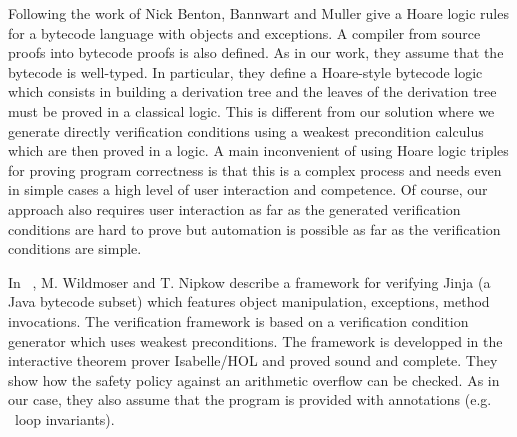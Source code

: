 Following the work of Nick Benton, Bannwart and Muller \cite{BannwartMueller05} give  a Hoare logic rules
for a bytecode language with objects and  exceptions. A compiler from source proofs into bytecode proofs is also defined. 
As in our work, they assume that the bytecode is well-typed. 
In particular, they define a Hoare-style bytecode logic which consists in building a derivation tree 
and the leaves of the derivation tree must be proved in a classical logic. This is different from our solution
where we generate directly  verification conditions using a weakest precondition calculus which are then proved in a logic.
 A main inconvenient of using  Hoare logic triples for proving program correctness is that this is  
  a complex process and needs even in simple cases a high level of user interaction and competence. Of course, our approach
 also requires user interaction as far as the generated verification conditions are hard to prove but automation 
 is possible as far as the verification conditions are simple.
  
 In ~\cite{WildmoserN-ESOP05}, M. Wildmoser and T. Nipkow describe a framework for verifying Jinja (a Java   bytecode subset) which features
 object manipulation, exceptions, method invocations. The verification framework is   based on a verification condition generator which uses
 weakest preconditions. The  framework is developped  in the interactive theorem prover Isabelle/HOL and proved sound and complete. 
 They show how the safety policy against an arithmetic overflow can be checked. As in our case, they also assume that the program is provided
with annotations (e.g. \ loop invariants). 


